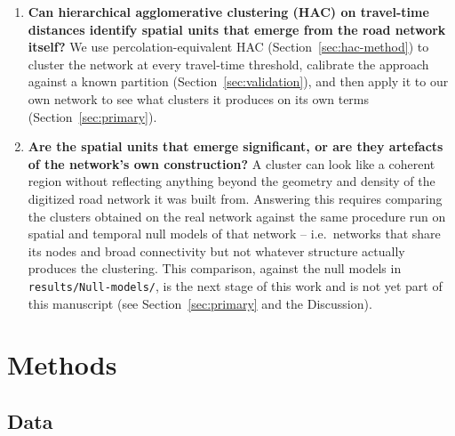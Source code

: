 \documentclass[11pt,a4paper]{article}
\begin{document}
\begin{enumerate}
\item \textbf{Can hierarchical agglomerative clustering (HAC) on
  travel-time distances identify spatial units that emerge from the road
  network itself?} We use percolation-equivalent HAC (Section~\ref{sec:hac-method})
  to cluster the network at every travel-time threshold, calibrate the
  approach against a known partition (Section~\ref{sec:validation}), and
  then apply it to our own network to see what clusters it produces on
  its own terms (Section~\ref{sec:primary}).
\item \textbf{Are the spatial units that emerge significant, or are they
  artefacts of the network's own construction?} A cluster can look like a
  coherent region without reflecting anything beyond the geometry and
  density of the digitized road network it was built from. Answering this
  requires comparing the clusters obtained on the real network against
  the same procedure run on spatial and temporal null models of that
  network -- i.e.\ networks that share its nodes and broad connectivity
  but not whatever structure actually produces the clustering. This
  comparison, against the null models in \texttt{results/Null-models/},
  is the next stage of this work and is not yet part of this manuscript
  (see Section~\ref{sec:primary} and the Discussion).
\end{enumerate}

\section{Methods}

\subsection{Data}
\end{document}
